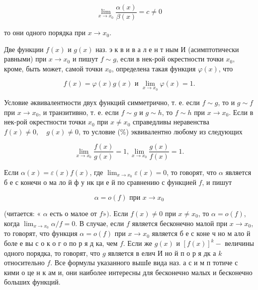 \documentclass[10pt]{article}
\begin{document}
\[

\lim _{x \rightarrow x_{0}} \frac{\alpha(x)}{\beta(x)}=c \neq 0

\]



то они одного порядка при $x \rightarrow x_{0}$.



Две функции $f(x)$ и $g(x)$ наз. э к в и в а л е н т ным И (асимптотически равными) при $x \rightarrow x_{0}$ и пишут $f \sim g$, если в нек-рой окрестности точки $x_{0}$, кроме, быть может, самой точки $x_{0}$, определена такая функция $\varphi(x)$, что



\[

f(x)=\varphi(x) g(x) \text { и } \lim _{x \rightarrow x_{0}} \varphi(x)=1 .

\]



Условие әквивалентности двух функций симметрично, т. е. если $f \sim g$, то и $g \sim f$ при $x \rightarrow x_{0}$, и транзитивно, т. е. если $f \sim g$ и $g \sim h$, то $f \sim h$ при $x \rightarrow x_{0}$. Если в нек-рой окрестности точки $x_{0}$ при $x \neq x_{0}$ справедливы неравенства $f(x) \neq 0, \quad g(x) \neq 0$, то условие (\%) эквивалентно любому из следующих



\[

\lim _{x \rightarrow x_{0}} \frac{f(x)}{g(x)}=1, \lim _{x \rightarrow x_{0}} \frac{g(x)}{f(x)}=1 .

\]



Если $\alpha(x)=\varepsilon(x) f(x)$, где $\lim _{x \rightarrow x_{0}} \varepsilon(x)=0$, то говорят, что $\alpha$ является б е с конечн о ма ло й ф у нк ци е й по сравнению с функцией $f$, и пишут



\[

\alpha=o(f) \text { при } x \rightarrow x_{0}

\]



(читается: « $\alpha$ есть $о$ малое от $f »)$. Если $f(x) \neq 0$ при $x \neq x_{0}$, то $\alpha=o(f)$, когда $\lim _{x \rightarrow x_{0}} \alpha / f=0$. В случае, если $f$ является бесконечно малой при $x \rightarrow x_{0}$, то говорят, что функция $\alpha=o(f)$ при $x \rightarrow x_{0}$ является б е с коне ч но м ало й боле е вы с о к о г о по р я д ка, чем $f$. Если же $g(x)$ и $[f(x)]^{k}-$ величины одного порядка, то говорят, что $g$ является в елич И но й п о р я дк а $k$ относительно $f$. Все формулы указанного вышІе вида наз. а с и м п тотиче с кими о це н к ам и, они наиболее интересны для бесконечно малых и бесконечно больших функций.
\end{document}
